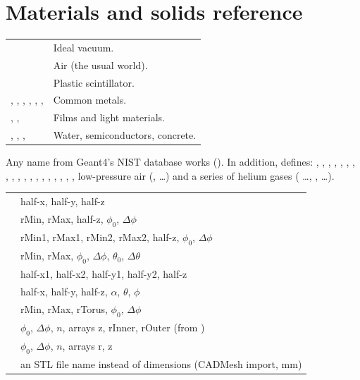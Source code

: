 \chapter{Materials and solids reference}
\label{app:solids}

{\tablestyle
\begin{tabularx}{\textwidth}{@{}>{\raggedright\arraybackslash}p{} L@{}}
\toprule
{} & Ideal vacuum.\\
 & Air (the usual world).\\
 & Plastic scintillator.\\
, , , , , ,  & Common metals.\\
, ,  & Films and light materials.\\
, , ,  & Water, semiconductors, concrete.\\
\bottomrule
\end{tabularx}}

Any name from Geant4's NIST database works (). In addition,  defines: , , , , , , , , , , , , , , , , , , , low-pressure air (,  \dots {}) and a series of helium gases ( \dots {}, , \dots).

{\tablestyle
\begin{tabularx}{\textwidth}{@{}l L@{}}
\toprule
{} & half-x, half-y, half-z\\
 & rMin, rMax, half-z, \(\phi_0\), \(\Delta\phi\)\\
 & rMin1, rMax1, rMin2, rMax2, half-z, \(\phi_0\), \(\Delta\phi\)\\
 & rMin, rMax, \(\phi_0\), \(\Delta\phi\), \(\theta_0\), \(\Delta\theta\)\\
 & half-x1, half-x2, half-y1, half-y2, half-z\\
 & half-x, half-y, half-z, \(\alpha\), \(\theta\), \(\phi\)\\
 & rMin, rMax, rTorus, \(\phi_0\), \(\Delta\phi\)\\
 & \(\phi_0\), \(\Delta\phi\), \(n\), arrays z, rInner, rOuter (from )\\
 & \(\phi_0\), \(\Delta\phi\), \(n\), arrays r, z\\
 & an STL file name instead of dimensions (CADMesh import, mm)\\
\bottomrule
\end{tabularx}}

